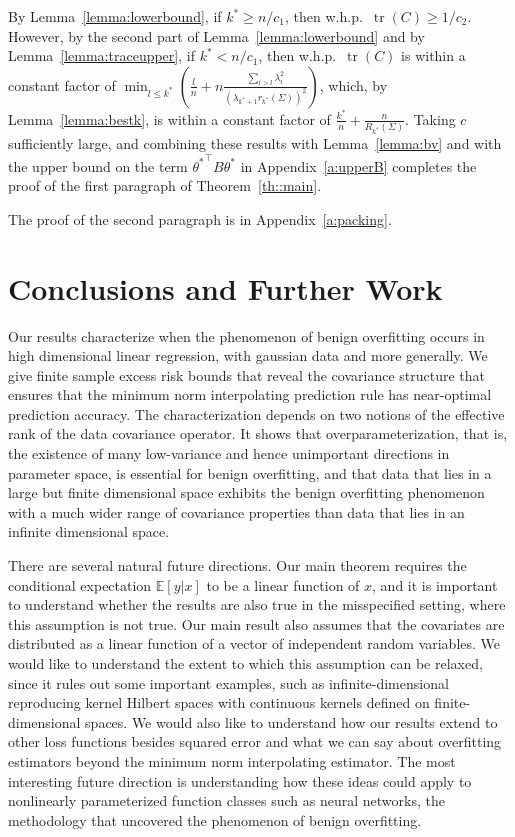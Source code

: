 \documentclass[11pt,notitlepage]{article}
\newcommand\E {\mathbb{E}}
\newcommand\Expect{\E}
\newcommand\tr {\ensuremath{\operatorname{\mathrm{tr}}}}
\begin{document}
By Lemma~\ref{lemma:lowerbound}, if $k^* \geq n/c_1$, then
w.h.p.~$\tr(C)\geq 1/c_2$.
However, by the second part of Lemma~\ref{lemma:lowerbound} and
by Lemma~\ref{lemma:traceupper}, if $k^* < n/c_1$, then w.h.p.~$\tr(C)$
is within a constant factor of $\min_{l\le k^*} \left(
      \frac{l}{n} + n\frac{\sum_{i>l}\lambda_i^2}
      {\left(\lambda_{k^*+1}r_{k^*}(\Sigma)\right)^2}\right)$,
which, by Lemma~\ref{lemma:bestk}, is 
within a constant factor of $\frac{k^*}{n} + \frac{n}{R_{k^*}(\Sigma)}.$
Taking $c$ sufficiently large, and combining
these results with Lemma~\ref{lemma:bv} and with the upper bound on the
term ${\theta^\ast}^\top B \theta^\ast$ in Appendix~\ref{a:upperB}
completes the proof of the first paragraph of Theorem~\ref{th::main}.

The proof of the second paragraph is in Appendix~\ref{a:packing}.

\section{Conclusions and Further Work}\label{section:further}

Our results characterize when the phenomenon of benign overfitting
occurs in high dimensional linear regression, with gaussian data
and more generally. We
give finite sample excess risk bounds that reveal the covariance
structure that ensures that the minimum norm interpolating prediction
rule has near-optimal prediction accuracy. The characterization
depends on two notions of the effective rank of the data covariance
operator. It shows that overparameterization, that is, the existence
of many low-variance and hence unimportant directions in parameter
space, is essential for benign overfitting, and that
data that lies in a large but finite dimensional space exhibits the
benign overfitting phenomenon with a much wider range of covariance
properties than data that lies in an infinite dimensional space.

There are several natural future directions. Our main theorem
requires the conditional expectation $\Expect[y|x]$ to be a linear
function of $x$, and it is important to understand whether the results
are also true in the misspecified setting, where this assumption is
not true. Our main result also assumes
that the covariates are distributed as a linear function of a vector
of independent random variables. We would like to understand the
extent to which this assumption can be relaxed, since it rules out
some important examples, such as infinite-dimensional reproducing
kernel Hilbert spaces with continuous kernels defined on
finite-dimensional spaces.
We would also like to
understand how our results extend to other loss functions besides
squared error and what we can say about overfitting estimators
beyond the minimum norm interpolating estimator. The most interesting
future direction is understanding how these ideas could apply to
nonlinearly parameterized function classes such as neural networks,
the methodology that uncovered the phenomenon of benign overfitting.
\end{document}
